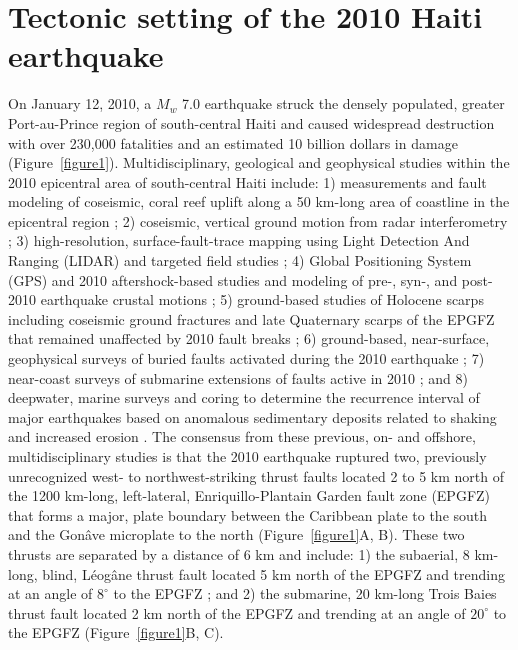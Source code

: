 \documentclass[linenumbers,draft]{agujournal}
\begin{document}
\section{Tectonic setting of the 2010 Haiti earthquake}
\label{sec:intro}
On January 12, 2010, a $M_w$ 7.0 earthquake struck the densely populated, greater Port-au-Prince region of south-central Haiti and caused widespread destruction with over 230,000 fatalities and an estimated 10 billion dollars in damage \citep{prentice2010seismic,bilham2010lessons,paultre2013damage,kocel2016near} (Figure~\ref{figure1}). Multidisciplinary, geological and geophysical studies within the 2010 epicentral area of south-central Haiti include: 1) measurements and fault modeling of coseismic, coral reef uplift along a 50 km-long area of coastline in the epicentral region \citep{hayes2010complex}; 2) coseismic, vertical ground motion from radar interferometry \citep{hashimoto2011fan}; 3) high-resolution, surface-fault-trace mapping using Light Detection And Ranging (LIDAR) and targeted field studies \citep{cowgill2012interactive}; 4) Global Positioning System (GPS) and 2010 aftershock-based studies and modeling of pre-, syn-, and post-2010 earthquake crustal motions \citep{calais2010transpressional,nettles2010earthquake,symithe2013coseismic,douilly2013crustal,douilly2015three}; 5) ground-based studies of Holocene scarps including coseismic ground fractures and late Quaternary scarps of the EPGFZ that remained unaffected by 2010 fault breaks \citep{prentice2010seismic,koehler2011field,rathje2014geotechnical,saint2015seismotectonics}; 6) ground-based, near-surface, geophysical surveys of buried faults activated during the 2010 earthquake \citep{kocel2016near}; 7) near-coast surveys of submarine extensions of faults active in 2010 \citep{hornbach2010high,mercier20112010}; and 8) deepwater, marine surveys and coring to determine the recurrence interval of major earthquakes based on anomalous sedimentary deposits related to shaking and increased erosion \citep{mchugh2011offshore}. The consensus from these previous, on- and offshore, multidisciplinary studies is that the 2010 earthquake ruptured two, previously unrecognized west- to northwest-striking thrust faults located 2 to 5 km north of the 1200 km-long, left-lateral, Enriquillo-Plantain Garden fault zone (EPGFZ) that forms a major, plate boundary between the Caribbean plate to the south and the Gon\^ave microplate to the north \citep{mann1995actively,calais2010transpressional,benford2012gps,corbeau2016transpressive} (Figure~\ref{figure1}A, B). These two thrusts are separated by a distance of 6 km and include: 1) the subaerial, 8 km-long, blind, L\'eog\^ane thrust fault located 5 km north of the EPGFZ and trending at an angle of $8^{\circ}$ to the EPGFZ \citep{calais2010transpressional,douilly2013crustal,douilly2015three}; and 2) the submarine, 20 km-long Trois Baies thrust fault located 2 km north of the EPGFZ and trending at an angle of $20^{\circ}$ to the EPGFZ \citep{mercier20112010,symithe2013coseismic} (Figure~\ref{figure1}B, C).
\end{document}
